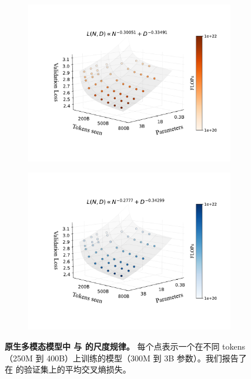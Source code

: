 \begin{figure}[t!]
    \centering
    \captionsetup{type=figure}
    \begin{subfigure}[t]{0.48\linewidth}
        \centering
        \includegraphics[width=1.02\linewidth]{assets/early/3d_scaling_early.pdf}
    \end{subfigure}
    \hfil
    \begin{subfigure}[t]{0.48\linewidth}
        \centering
        \includegraphics[width=1.02\linewidth]{assets/early/3d_scaling_late.pdf}
    \end{subfigure}
    \vspace{5pt}
    \setlength{\fboxsep}{0.5pt}
    \setlength{\fboxrule}{0pt}
    \caption{\textbf{原生多模态模型中  与  的尺度规律。} 每个点表示一个在不同  tokens（250M 到 400B）上训练的模型（300M 到 3B 参数）。我们报告了在  的验证集上的平均交叉熵损失。}
    \label{fig:early_vs_late_scaleflops_3d}
\end{figure}
